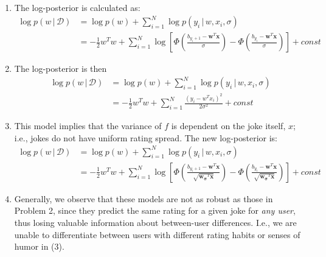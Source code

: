 \documentclass[submit]{harvardml}
\newcommand{\given}{\,|\,}
\theoremstyle{plain}
\begin{document}
\begin{enumerate}
	\item The log-posterior is calculated as:
	\begin{align*}
	\log p(w\given\mathcal{D}) &= \log p(w) + \sum_{i=1}^N \log p(y_i\given w, x_i, \sigma) \\
	&= - \frac{1}{2} w^Tw + \sum_{i=1}^N \log \left[\Phi\left(\frac{b_{y_i+1} - \bm{w}^T\bm{x}}{\sigma}\right) - \Phi\left(\frac{b_{y_i} - \bm{w}^T\bm{x}}{\sigma}\right)\right] + const
	\end{align*}
	
	\item The log-posterior is then
	\begin{align*}
	\log p(w\given\mathcal{D}) &= \log p(w) + \sum_{i=1}^N \log p(y_i\given w, x_i, \sigma) \\
	&= - \frac{1}{2} w^Tw + \sum_{i=1}^N \frac{(y_i - w^Tx_i)^2}{2\sigma^2} + const
	\end{align*}
	
	\item This model implies that the variance of $f$ is dependent on the joke itself, $x$; i.e., jokes do not have uniform rating spread. The new log-posterior is:
	\begin{align*}
	\log p(w\given\mathcal{D}) &= \log p(w) + \sum_{i=1}^N \log p(y_i\given w, x_i, \sigma) \\
	&= - \frac{1}{2} w^Tw + \sum_{i=1}^N \log \left[\Phi\left(\frac{b_{y_i+1} - \bm{w}^T\bm{x}}{\sqrt{\bm{w_\sigma}^T\bm{x}}}\right) - \Phi\left(\frac{b_{y_i} - \bm{w}^T\bm{x}}{\sqrt{\bm{w_\sigma}^T\bm{x}}}\right)\right] + const
	\end{align*}
	
	\item Generally, we observe that these models are not as robust as those in Problem 2, since they predict the same rating for a given joke for \textit{any user}, thus losing valuable information about between-user differences. I.e., we are unable to differentiate between users with different rating habits or senses of humor in (3).
	
\end{enumerate}
\end{document}
